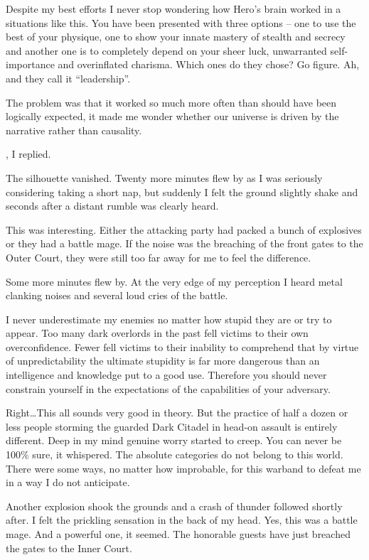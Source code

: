 Despite my best efforts I never stop wondering how Hero’s brain worked in a situations like this. You have been presented with three options – one to use the best of your physique, one to show your innate mastery of stealth and secrecy and another one is to completely depend on your sheer luck, unwarranted self-importance and overinflated charisma. Which ones do they chose? Go figure. Ah, and they call it “leadership”.

The problem was that it worked so much more often than should have been logically expected, it made me wonder whether our universe is driven by the narrative rather than causality.

, I replied. 

The silhouette vanished. Twenty more minutes flew by as I was seriously considering taking a short nap, but suddenly I felt the ground slightly shake and seconds after a distant rumble was clearly heard.

This was interesting. Either the attacking party had packed a bunch of explosives or they had a battle mage. If the noise was the breaching of the front gates to the Outer Court, they were still too far away for me to feel the difference.

Some more minutes flew by. At the very edge of my perception I heard metal clanking noises and several loud cries of the battle.

I never underestimate my enemies no matter how stupid they are or try to appear. Too many dark overlords in the past fell victims to their own overconfidence. Fewer fell victims to their inability to comprehend that by virtue of unpredictability the ultimate stupidity is far more dangerous than an intelligence and knowledge put to a good use. Therefore you should never constrain yourself in the expectations of the capabilities of your adversary.

Right\dots This all sounds very good in theory. But the practice of half a dozen or less people storming the guarded Dark Citadel in head-on assault is entirely different. Deep in my mind genuine worry started to creep. You can never be 100\% sure, it whispered. The absolute categories do not belong to this world. There were some ways, no matter how improbable, for this warband to defeat me in a way I do not anticipate.

Another explosion shook the grounds and a crash of thunder followed shortly after. I felt the prickling sensation in the back of my head. Yes, this was a battle mage. And a powerful one, it seemed. The honorable guests have just breached the gates to the Inner Court.

